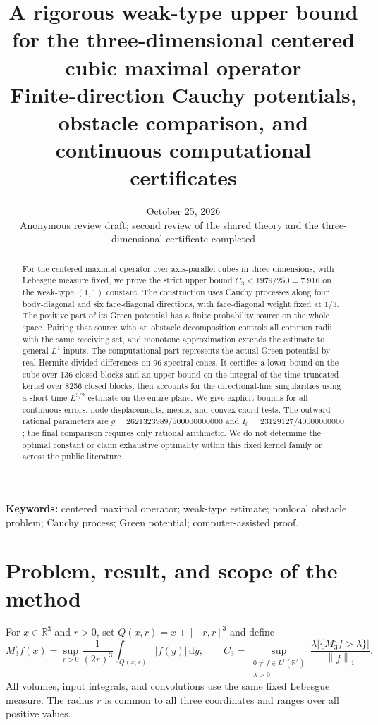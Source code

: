 \documentclass[11pt,a4paper]{article}
\title{A rigorous weak-type upper bound for the three-dimensional centered cubic maximal operator\\\large Finite-direction Cauchy potentials, obstacle comparison, and continuous computational certificates}
\author{}
\date{October 25, 2026\\\small Anonymous review draft; second review of the shared theory and the three-dimensional certificate completed}
\theoremstyle{definition}\newtheorem{definition}[theorem]{Definition}
\theoremstyle{remark}\newtheorem{remark}[theorem]{Remark}
\newcommand{\R}{\mathbb R}
\newcommand{\dd}{\,\mathrm d}
\newcommand{\norm}[1]{\left\lVert#1\right\rVert}
\newcommand{\abs}[1]{\left|#1\right|}
\begin{document}
\maketitle
\begin{abstract}
For the centered maximal operator over axis-parallel cubes in three dimensions, with Lebesgue measure fixed, we prove the strict upper bound $C_3<1979/250=7.916$ on the weak-type $(1,1)$ constant. The construction uses Cauchy processes along four body-diagonal and six face-diagonal directions, with face-diagonal weight fixed at $1/3$. The positive part of its Green potential has a finite probability source on the whole space. Pairing that source with an obstacle decomposition controls all common radii with the same receiving set, and monotone approximation extends the estimate to general $L^1$ inputs. The computational part represents the actual Green potential by real Hermite divided differences on 96 spectral cones. It certifies a lower bound on the cube over 136 closed blocks and an upper bound on the integral of the time-truncated kernel over 8256 closed blocks, then accounts for the directional-line singularities using a short-time $L^{3/2}$ estimate on the entire plane. We give explicit bounds for all continuous errors, node displacements, means, and convex-chord tests. The outward rational parameters are $g=2621323989/500000000000$ and $I_0=23129127/40000000000$; the final comparison requires only rational arithmetic. We do not determine the optimal constant or claim exhaustive optimality within this fixed kernel family or across the public literature.
\end{abstract}
\noindent\textbf{Keywords:} centered maximal operator; weak-type estimate; nonlocal obstacle problem; Cauchy process; Green potential; computer-assisted proof.

\section{Problem, result, and scope of the method}
For $x\in\R^3$ and $r>0$, set $Q(x,r)=x+[-r,r]^3$ and define
\begin{equation}\label{eq:maximal}
 M^\square_3 f(x)=\sup_{r>0}\frac1{(2r)^3}\int_{Q(x,r)}\abs{f(y)}\dd y,
 \qquad
 C_3=\sup_{\substack{0\ne f\in L^1(\R^3)\\\lambda>0}}
 \frac{\lambda\abs{\{M^\square_3 f>\lambda\}}}{\norm f_1}.
\end{equation}
All volumes, input integrals, and convolutions use the same fixed Lebesgue measure. The radius $r$ is common to all three coordinates and ranges over all positive values.
\end{document}
